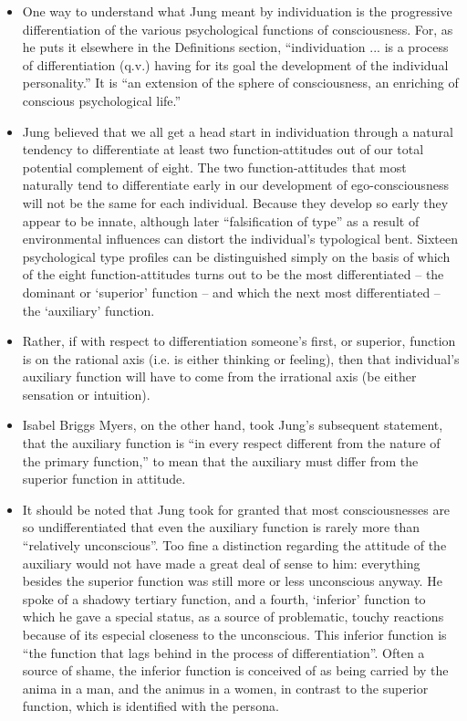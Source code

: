 \begin{itemize}
\item One way to understand what Jung meant by individuation is the progressive
differentiation of the various psychological functions of consciousness. For,
as he puts it elsewhere in the Definitions section, ``individuation ... is a
process of differentiation (q.v.) having for its goal the development of the
individual personality.'' It is ``an extension of the sphere of consciousness,
an enriching of conscious psychological life.''

\item Jung believed that we all get a head start in individuation through a
natural tendency to differentiate at least two function-attitudes out of our
total potential complement of eight.  The two function-attitudes that most
naturally tend to differentiate early in our development of ego-consciousness
will not be the same for each individual. Because they develop so early they
appear to be innate, although later ``falsification of type'' as a result of
environmental influences can distort the individual's typological bent. Sixteen
psychological type profiles can be distinguished simply on the basis of which
of the eight function-attitudes turns out to be the most differentiated -- the
dominant or `superior' function -- and which the next most differentiated --
the `auxiliary' function.

\item Rather, if with respect to differentiation someone's first, or superior,
function is on the rational axis (i.e. is either thinking or feeling), then
that individual's auxiliary function will have to come from the irrational axis
(be either sensation or intuition).

\item Isabel Briggs Myers, on the other hand, took Jung's subsequent statement,
that the auxiliary function is ``in every respect different from the nature of
the primary function,'' to mean that the auxiliary must differ from the
superior function in attitude.

\item It should be noted that Jung took for granted that most consciousnesses
are so undifferentiated that even the auxiliary function is rarely more than
``relatively unconscious''. Too fine a distinction regarding the attitude of
the auxiliary would not have made a great deal of sense to him: everything
besides the superior function was still more or less unconscious anyway. He
spoke of a shadowy tertiary function, and a fourth, `inferior' function to
which he gave a special status, as a source of problematic, touchy reactions
because of its especial closeness to the unconscious. This inferior function is
``the function that lags behind in the process of differentiation''. Often a
source of shame, the inferior function is conceived of as being carried by the
anima in a man, and the animus in a women, in contrast to the superior
function, which is identified with the persona.


\end{itemize}
